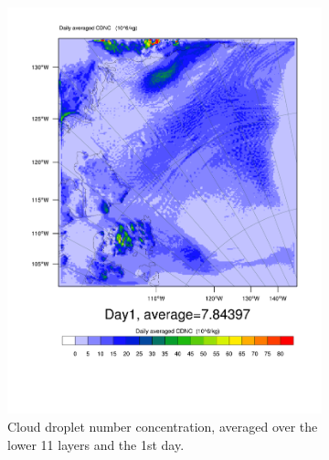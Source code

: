 \begin{figure}
	\begin{subfigure}{0.48\textwidth}
		\centering
		\includegraphics[width=\textwidth]{results/control/QNCLOUD_Day1.pdf}
		\caption{Cloud droplet number concentration, averaged over the lower 11 layers and the 1st day.}
		\label{subfig:cdnc_cont_Day1}
	\end{subfigure}
	\begin{subfigure}{0.48\textwidth}
		\centering

\end{subfigure}
\end{figure}
